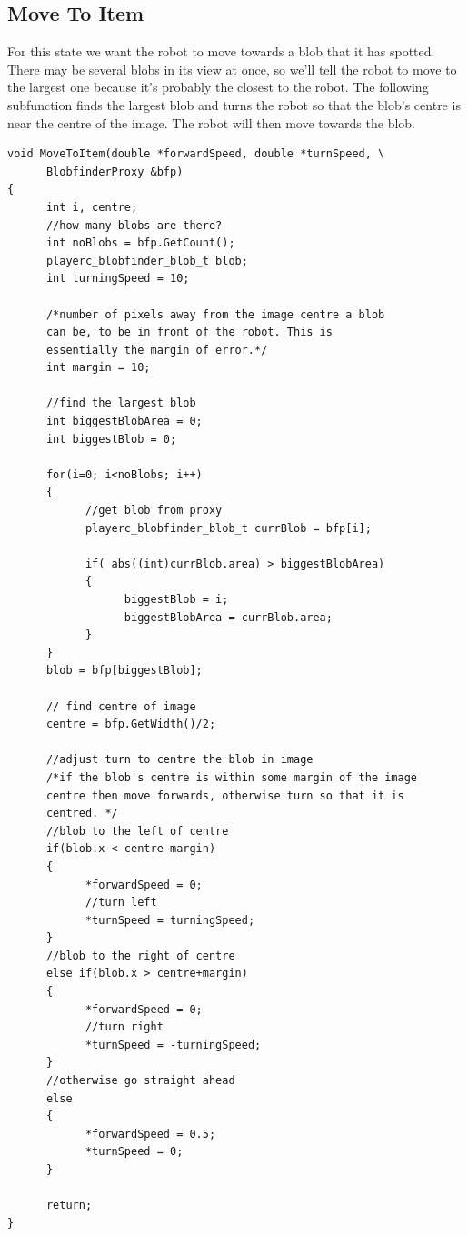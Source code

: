 \documentclass[a4paper]{report}
\begin{document}
\subsection{Move To Item}
For this state we want the robot to move towards a blob that it has spotted. There may be several blobs in its view at once, so we'll tell the robot to move to the largest one because it's probably the closest to the robot. The following subfunction finds the largest blob and turns the robot so that the blob's centre is near the centre of the image. The robot will then move towards the blob.
\begin{verbatim}
void MoveToItem(double *forwardSpeed, double *turnSpeed, \
      BlobfinderProxy &bfp)
{
      int i, centre;
      //how many blobs are there?
      int noBlobs = bfp.GetCount();
      playerc_blobfinder_blob_t blob;
      int turningSpeed = 10;
      
      /*number of pixels away from the image centre a blob
      can be, to be in front of the robot. This is 
      essentially the margin of error.*/
      int margin = 10;

      //find the largest blob      
      int biggestBlobArea = 0;
      int biggestBlob = 0;
      
      for(i=0; i<noBlobs; i++)
      {
            //get blob from proxy
            playerc_blobfinder_blob_t currBlob = bfp[i];
            
            if( abs((int)currBlob.area) > biggestBlobArea)
            {
                  biggestBlob = i;
                  biggestBlobArea = currBlob.area;
            }
      }
      blob = bfp[biggestBlob];
            
      // find centre of image
      centre = bfp.GetWidth()/2;
      
      //adjust turn to centre the blob in image
      /*if the blob's centre is within some margin of the image 
      centre then move forwards, otherwise turn so that it is 
      centred. */
      //blob to the left of centre
      if(blob.x < centre-margin)
      {
            *forwardSpeed = 0;
            //turn left
            *turnSpeed = turningSpeed;
      }
      //blob to the right of centre
      else if(blob.x > centre+margin)
      {
            *forwardSpeed = 0;
            //turn right
            *turnSpeed = -turningSpeed;
      }
      //otherwise go straight ahead
      else
      {
            *forwardSpeed = 0.5;
            *turnSpeed = 0;      
      }
      
      return;
}
\end{verbatim}
\end{document}

